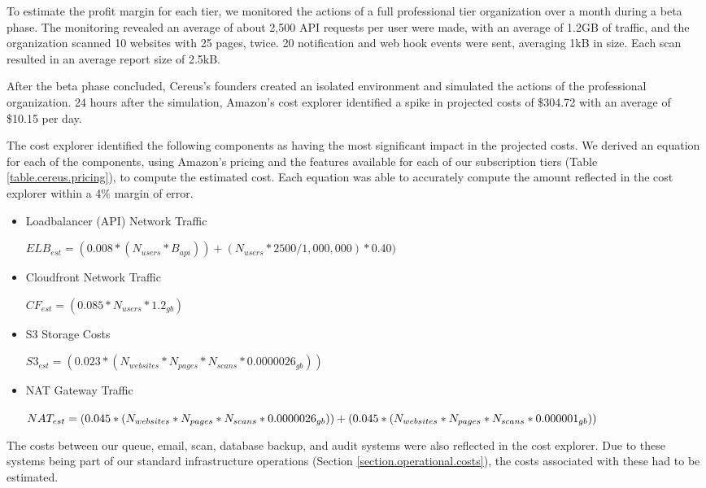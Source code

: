 To estimate the profit margin for each tier, we monitored the actions of a full professional tier organization over a month during a beta phase. The monitoring revealed an average of about 2,500 API requests per user were made, with an average of 1.2GB of traffic, and the organization scanned 10 websites with 25 pages, twice. 20 notification and web hook events were sent, averaging 1kB in size. Each scan resulted in an average report size of 2.5kB. 

After the beta phase concluded, Cereus's founders created an isolated environment and simulated the actions of the professional organization. 24 hours after the simulation, Amazon's cost explorer identified a spike in projected costs of \$304.72 with an average of \$10.15 per day.

The cost explorer identified the following components as having the most significant impact in the projected costs. We derived an equation for each of the components, using Amazon's pricing and the features available for each of our subscription tiers (Table \ref{table.cereus.pricing}), to compute the estimated cost. Each equation was able to accurately compute the amount reflected in the cost explorer within a 4\% margin of error.

\begin{itemize}

\item Loadbalancer (API) Network Traffic

\( ELB_{est} = (0.008*(N_{users}*B_{api})) + (N_{users}*2500/1,000,000)*0.40) \)

\item Cloudfront Network Traffic

\( CF_{est} = (0.085 * N_{users} * 1.2_{gb}) \)

\item S3 Storage Costs

\(S3_{est} = (0.023 * (N_{websites} * N_{pages} * N_{scans} * 0.0000026_{gb}))\)

\item NAT Gateway Traffic

\(
  NAT_{est} = (0.045 * (N_{websites} * N_{pages} * N_{scans} * 0.0000026_{gb})) + \\
  (0.045 * (N_{websites} * N_{pages} * N_{scans} * 0.000001_{gb}))
\)

\end{itemize}

The costs between our queue, email, scan, database backup, and audit systems were also reflected in the cost explorer. Due to these systems being part of our standard infrastructure operations (Section \ref{section.operational.costs}), the costs associated with these had to be estimated.

